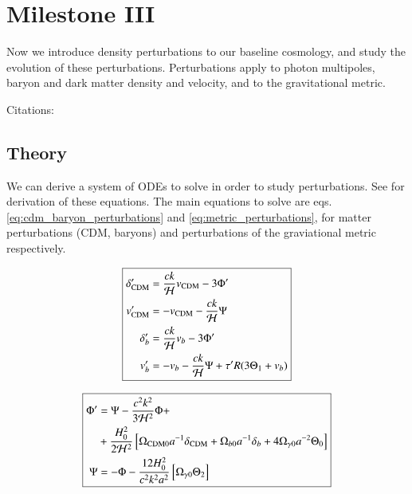 \FloatBarrier
\section{Milestone III}
Now we introduce density perturbations to our baseline cosmology, and study the evolution of these perturbations. Perturbations apply to photon multipoles, baryon and dark matter density and velocity, and to the gravitational metric.

Citations: \citet{maCosmologicalPerturbationTheory1995}

\subsection{Theory}
We can derive a system of ODEs to solve in order to study perturbations. See \citet[part 3, cosmological perturbation theory]{wintherCosmologyIILecture2024} for derivation of these equations. The main equations to solve are eqs. \ref{eq:cdm_baryon_perturbations} and \ref{eq:metric_perturbations}, for matter perturbations (CDM, baryons) and perturbations of the graviational metric respectively.

\begin{equation}\label{eq:cdm_baryon_perturbations}
\boxed{
\begin{aligned}
\delta_{\rm CDM}^\prime &= \frac{ck}{\mathcal{H}} v_{\rm CDM} - 3\Phi^\prime \\
v_{\rm CDM}^\prime &= -v_{\rm CDM} -\frac{ck}{\mathcal{H}} \Psi \\
\delta_b^\prime &= \frac{ck}{\mathcal{H}}v_b -3\Phi^\prime \\
v_b^\prime &= -v_b - \frac{ck}{\mathcal{H}}\Psi + \tau^\prime R(3\Theta_1 + v_b) \\
\end{aligned}
}
\end{equation}

\begin{equation}\label{eq:metric_perturbations}
\boxed{
\begin{aligned}
\Phi^\prime &= \Psi - \frac{c^2k^2}{3\mathcal{H}^2} \Phi + \\
    &+ \frac{H_0^2}{2\mathcal{H}^2} \left[\Omega_{\rm CDM 0} a^{-1} \delta_{\rm CDM} + \Omega_{b 0} a^{-1} \delta_b + 4\Omega_{\gamma 0}a^{-2}\Theta_0\right] \\
\Psi &= -\Phi - \frac{12H_0^2}{c^2k^2a^2}\left[\Omega_{\gamma 0}\Theta_2\right] \\
\end{aligned}
}
\end{equation}

